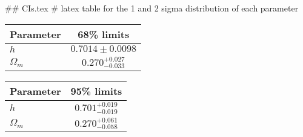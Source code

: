 ## CIs.tex
# latex table for the 1 and 2 sigma distribution of each parameter

\begin{tabular} { l  c}
 Parameter &  68\% limits\\
\hline
{\boldmath$h              $} & $0.7014\pm 0.0098          $\\
{\boldmath$\Omega_m       $} & $0.270^{+0.027}_{-0.033}   $\\
\hline
\end{tabular}

\begin{tabular} { l  c}
 Parameter &  95\% limits\\
\hline
{\boldmath$h              $} & $0.701^{+0.019}_{-0.019}   $\\
{\boldmath$\Omega_m       $} & $0.270^{+0.061}_{-0.058}   $\\
\hline
\end{tabular}
